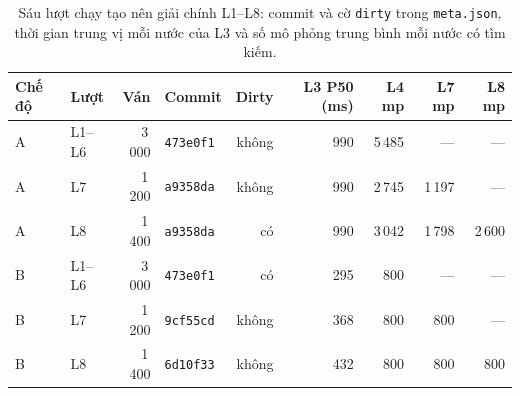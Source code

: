 \begin{table}[H]
  \centering\footnotesize
  \caption{Sáu lượt chạy tạo nên giải chính L1--L8: commit và cờ \texttt{dirty} trong \texttt{meta.json}, thời gian trung vị mỗi nước của L3 và số mô phỏng trung bình mỗi nước có tìm kiếm.}
  \label{tab:giai-luot}
  \setlength{\tabcolsep}{4pt}
  \begin{tabular}{@{}llrlrrrrr@{}}
    \toprule
    Chế độ & Lượt & Ván & Commit & Dirty & L3 P50 (ms) & L4 mp & L7 mp & L8 mp \\
    \midrule
    A & L1--L6 & 3\,000 & \texttt{473e0f1} & không & 990 & 5\,485 & --- & --- \\
    A & L7 & 1\,200 & \texttt{a9358da} & không & 990 & 2\,745 & 1\,197 & --- \\
    A & L8 & 1\,400 & \texttt{a9358da} & có & 990 & 3\,042 & 1\,798 & 2\,600 \\
    B & L1--L6 & 3\,000 & \texttt{473e0f1} & có & 295 & 800 & --- & --- \\
    B & L7 & 1\,200 & \texttt{9cf55cd} & không & 368 & 800 & 800 & --- \\
    B & L8 & 1\,400 & \texttt{6d10f33} & không & 432 & 800 & 800 & 800 \\
    \bottomrule
  \end{tabular}
\end{table}
